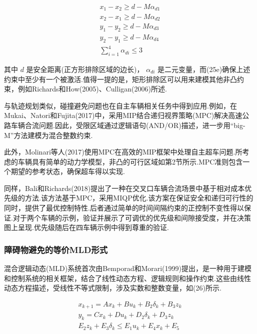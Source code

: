 \documentclass[10pt]{article}
\begin{document}
\begin{subequations}
\begin{gather}
{x}_{1} - {x}_{2} \geq  d - M{\alpha }_{d1} \\
{x}_{2} - {x}_{1} \geq  d - M{\alpha }_{d2} \\
{y}_{1} - {y}_{2} \geq  d - M{\alpha }_{d3} \\
{y}_{2} - {y}_{1} \geq  d - M{\alpha }_{d4} \\
\mathop{\sum }\limits_{{i = 1}}^{4}{\alpha }_{di} \leq  3
\end{gather}
\end{subequations}

其中 \(d\) 是安全距离(正方形排除区域的边长)， \({\alpha }_{di}\) 是二元变量，而(25e)确保上述约束中至少有一个被激活.值得一提的是，矩形排除区可以用来建模其他非凸约束，例如Richards和How(2005)、Culligan(2006)所述.

与轨迹规划类似，碰撞避免问题也在自主车辆相关任务中得到应用.例如，在Mukai、Natori和Fujita(2017)中，采用MIP结合递归视界策略(MPC)解决高速公路车辆合流问题.因此，受限区域通过逻辑语句(AND/OR)描述，进一步用“big-M”方法建模为混合整数约束.

此外，Molinari等人(2017)使用MPC在高效的MIP框架中处理自主超车问题.所考虑的车辆具有简单的动力学模型，非凸的可行区域如第2节所示.MPC准则包含一个期望的参考状态，确保超车得以实现.

同样，Bali和Richards(2018)提出了一种在交叉口车辆合流场景中基于相对成本优先级的方法.该方法基于MPC，采用MIQP优化.该方案在保证安全和递归可行性的同时，提供了最优控制特性.后者通过简单的时间间隔约束的正控制不变性得以保证.对于两个车辆的示例，验证并展示了可调优的优先级和间隙接受度，并在决策图上呈现.优先级随后在四车辆示例中得到尊重的验证.

\subsubsection*{障碍物避免的等价MLD形式}

混合逻辑动态(MLD)系统首次由Bemporad和Morari(1999)提出，是一种用于建模和控制系统的相关框架，结合了线性动态方程、逻辑规则和操作约束.这些由线性动态方程描述，受线性不等式限制，涉及实数和整数变量，如(26)所示.

\begin{subequations}
\begin{gather}
{x}_{k + 1} = A{x}_{k} + B{u}_{k} + {B}_{2}{\delta }_{k} + {B}_{3}{z}_{k} \\
{y}_{k} = C{x}_{k} + D{u}_{k} + {D}_{2}{\delta }_{k} + {D}_{3}{z}_{k} \\
{E}_{2}{z}_{k} + {E}_{3}{\delta }_{k} \leq  {E}_{1}{u}_{k} + {E}_{4}{x}_{k} + {E}_{5}
\end{gather}
\end{subequations}
\end{document}
